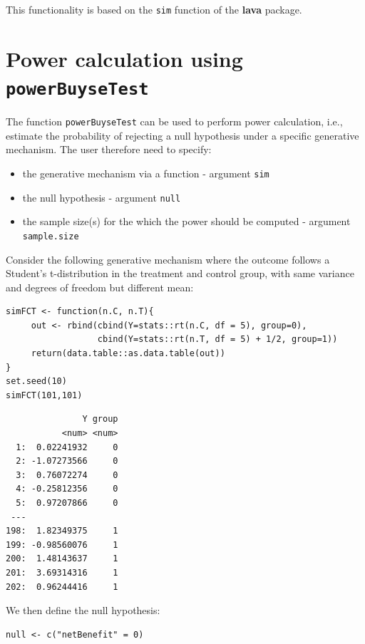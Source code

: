 \documentclass[12pt]{article}
\begin{document}
This functionality is based on the \texttt{sim} function of the \textbf{lava}
package.

\clearpage

\section{Power calculation using \texttt{powerBuyseTest}}
\label{sec:org37da868}

The function \texttt{powerBuyseTest} can be used to perform power
calculation, i.e., estimate the probability of rejecting a null
hypothesis under a specific generative mechanism. The user therefore
need to specify:
\begin{itemize}
\item the generative mechanism via a function \hfill - argument \texttt{sim}
\item the null hypothesis \hfill - argument \texttt{null}
\item the sample size(s) for the which the power should be computed  \hfill - argument \texttt{sample.size}
\end{itemize}

\bigskip

Consider the following generative mechanism where the outcome follows
a Student's t-distribution in the treatment and control group, with same
variance and degrees of freedom but different mean:
\lstset{language=r,label= ,caption= ,captionpos=b,numbers=none}
\begin{lstlisting}
simFCT <- function(n.C, n.T){
     out <- rbind(cbind(Y=stats::rt(n.C, df = 5), group=0),
                  cbind(Y=stats::rt(n.T, df = 5) + 1/2, group=1))
     return(data.table::as.data.table(out))
}
set.seed(10)
simFCT(101,101)
\end{lstlisting}

\begin{verbatim}
               Y group
           <num> <num>
  1:  0.02241932     0
  2: -1.07273566     0
  3:  0.76072274     0
  4: -0.25812356     0
  5:  0.97207866     0
 ---                  
198:  1.82349375     1
199: -0.98560076     1
200:  1.48143637     1
201:  3.69314316     1
202:  0.96244416     1
\end{verbatim}

We then define the null hypothesis:
\lstset{language=r,label= ,caption= ,captionpos=b,numbers=none}
\begin{lstlisting}
null <- c("netBenefit" = 0)
\end{lstlisting}
\end{document}

